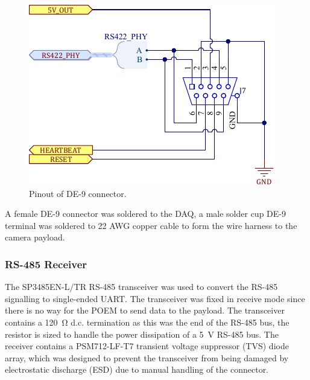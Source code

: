 \documentclass{report}
\begin{document}
\begin{figure}[H]
  \centering
  \includegraphics[width=\linewidth]{images/de-9-connector.pdf}
  \caption{Pinout of DE-9 connector.}
  \label{fig:de-9-connector}
\end{figure}

A female DE-9 connector was soldered to the DAQ, a male solder cup DE-9 terminal was soldered to 22 AWG copper cable to form the wire harness to the camera payload.

\subsubsection{RS-485 Receiver}
The SP3485EN-L/TR RS-485 transceiver was used to convert the RS-485 signalling to single-ended UART. The transceiver was fixed in receive mode since there is no way for the POEM to send data to the payload. The transceiver contains a \SI{120}{\ohm} d.c. termination as this was the end of the RS-485 bus, the resistor is sized to handle the power dissipation of a \SI{5}{\volt} RS-485 bus. The receiver contains a PSM712-LF-T7 transient voltage suppressor (TVS) diode array, which was designed to prevent the transceiver from being damaged by electrostatic discharge (ESD) due to manual handling of the connector.
\end{document}
